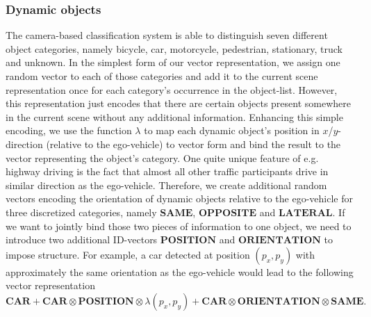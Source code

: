 \subsubsection{Dynamic objects} 
The camera-based classification system is able to distinguish seven different object categories, namely bicycle, car, motorcycle, pedestrian, stationary, truck and unknown.
In the simplest form of our vector representation, we assign one random vector to each of those categories and add it to the current scene representation once for each category's occurrence in the object-list. 
However, this representation just encodes that there are certain objects present somewhere in the current scene without any additional information.
Enhancing this simple encoding, we use the function $\lambda$ to map each dynamic object's position in $x$/$y$-direction (relative to the ego-vehicle) to vector form and bind the result to the vector representing the object's category. 
One quite unique feature of e.g. highway driving is the fact that almost all other traffic participants drive in similar direction as the ego-vehicle.
Therefore, we create additional random vectors encoding the orientation of dynamic objects relative to the ego-vehicle for three discretized categories, namely $\mathbf{SAME}$, $\mathbf{OPPOSITE}$ and $\mathbf{LATERAL}$. 
If we want to jointly bind those two pieces of information to one object, we need to introduce two additional ID-vectors $\mathbf{POSITION}$ and $\mathbf{ORIENTATION }$ to impose structure. 
For example, a car detected at position $\left(p_x,p_y\right)$ with approximately the same orientation as the ego-vehicle would lead to the following vector representation
\[ 
\mathbf{CAR} + \mathbf{CAR}\otimes\mathbf{POSITION}\otimes\lambda\left(p_x,p_y\right) + \mathbf{CAR}\otimes\mathbf{ORIENTATION}\otimes\mathbf{SAME}.
\]

